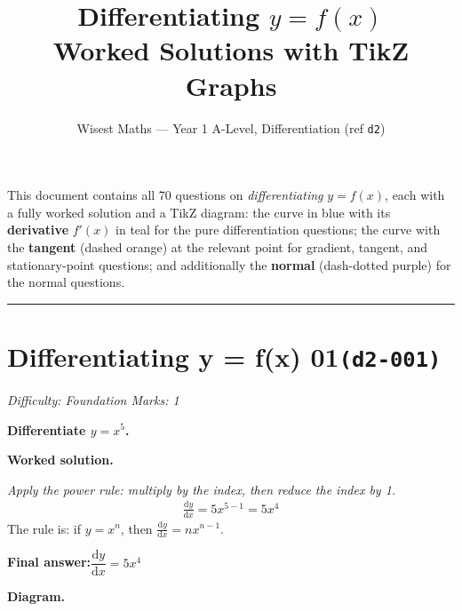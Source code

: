 \documentclass[11pt]{article}
\title{\textbf{Differentiating} $y=f(x)$\\[0.3em]\large Worked Solutions with TikZ Graphs}
\author{Wisest Maths --- Year 1 A-Level, Differentiation (ref \texttt{d2})}
\date{}
\newcommand{\question}[1]{\par\medskip\noindent\textbf{#1}\par}
\begin{document}
\maketitle
\noindent This document contains all 70 questions on \emph{differentiating} $y=f(x)$, each with a fully
worked solution and a TikZ diagram: the curve in blue with its \textbf{derivative} $f'(x)$ in teal for the
pure differentiation questions; the curve with the \textbf{tangent} (dashed orange) at the relevant point
for gradient, tangent, and stationary-point questions; and additionally the \textbf{normal} (dash-dotted
purple) for the normal questions.
\tableofcontents
\bigskip
\hrule

\section*{Differentiating y = f(x) 01\quad\small\texttt{(d2-001)}}
\textit{Difficulty: Foundation \quad\textbar\quad Marks: 1}

\question{Differentiate \( y = x^5 \).}

\textbf{Worked solution.}

\textit{Apply the power rule: multiply by the index, then reduce the index by 1.}
\[\begin{gathered}
\frac{\mathrm{d}y}{\mathrm{d}x} = 5x^{5-1} = 5x^4
\end{gathered}\]
The rule is: if \( y = x^n \), then \( \frac{\mathrm{d}y}{\mathrm{d}x} = nx^{n-1} \).

\begin{answerbox}
\textbf{Final answer:}\quad \(\displaystyle  \dfrac{\mathrm{d}y}{\mathrm{d}x} = 5x^4 \)
\end{answerbox}
\textbf{Diagram.}
\end{document}
